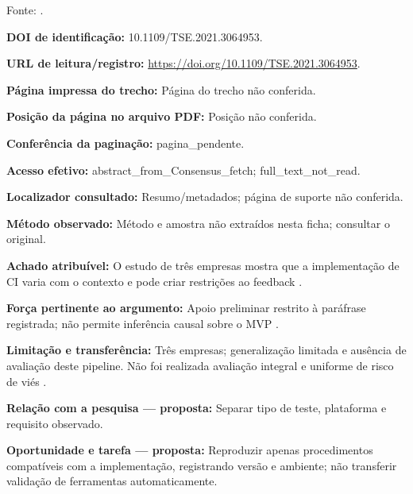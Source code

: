 Fonte: \citet{eng16}.

\noindent\textbf{DOI de identificação:} 10.1109/TSE.2021.3064953.\par\medskip

\noindent\textbf{URL de leitura/registro:} \url{https://doi.org/10.1109/TSE.2021.3064953}.\par\medskip

\noindent\textbf{Página impressa do trecho:} Página do trecho não conferida.\par\medskip

\noindent\textbf{Posição da página no arquivo PDF:} Posição não conferida.\par\medskip

\noindent\textbf{Conferência da paginação:} pagina\_pendente.\par\medskip

\noindent\textbf{Acesso efetivo:} abstract\_from\_Consensus\_fetch; full\_text\_not\_read.\par\medskip

\noindent\textbf{Localizador consultado:} Resumo/metadados; página de suporte não conferida.\par\medskip

\noindent\textbf{Método observado:} Método e amostra não extraídos nesta ficha; consultar o original.\par\medskip

\noindent\textbf{Achado atribuível:} O estudo de três empresas mostra que a implementação de CI varia com o contexto e pode criar restrições ao feedback \citep{eng16}.\par\medskip

\noindent\textbf{Força pertinente ao argumento:} Apoio preliminar restrito à paráfrase registrada; não permite inferência causal sobre o MVP \citep{eng16}.\par\medskip

\noindent\textbf{Limitação e transferência:} Três empresas; generalização limitada e ausência de avaliação deste pipeline. Não foi realizada avaliação integral e uniforme de risco de viés \citep{eng16}.\par\medskip

\noindent\textbf{Relação com a pesquisa — proposta:} Separar tipo de teste, plataforma e requisito observado.\par\medskip

\noindent\textbf{Oportunidade e tarefa — proposta:} Reproduzir apenas procedimentos compatíveis com a implementação, registrando versão e ambiente; não transferir validação de ferramentas automaticamente.\par\medskip

